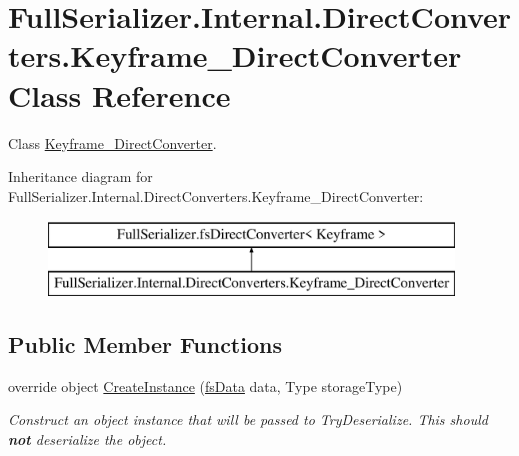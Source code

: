 \hypertarget{class_full_serializer_1_1_internal_1_1_direct_converters_1_1_keyframe___direct_converter}{}\section{Full\+Serializer.\+Internal.\+Direct\+Converters.\+Keyframe\+\_\+\+Direct\+Converter Class Reference}
\label{class_full_serializer_1_1_internal_1_1_direct_converters_1_1_keyframe___direct_converter}


Class \hyperlink{class_full_serializer_1_1_internal_1_1_direct_converters_1_1_keyframe___direct_converter}{Keyframe\+\_\+\+Direct\+Converter}.  


Inheritance diagram for Full\+Serializer.\+Internal.\+Direct\+Converters.\+Keyframe\+\_\+\+Direct\+Converter\+:\begin{figure}[H]
\begin{center}
\leavevmode
\includegraphics[height=2.000000cm]{class_full_serializer_1_1_internal_1_1_direct_converters_1_1_keyframe___direct_converter}
\end{center}
\end{figure}
\subsection*{Public Member Functions}
\begin{DoxyCompactItemize}
\item 
override object \hyperlink{class_full_serializer_1_1_internal_1_1_direct_converters_1_1_keyframe___direct_converter_aea3c4d54715cc2bc0d057c870916238b}{Create\+Instance} (\hyperlink{class_full_serializer_1_1fs_data}{fs\+Data} data, Type storage\+Type)
\begin{DoxyCompactList}\small\item\em Construct an object instance that will be passed to Try\+Deserialize. This should {\bfseries not} deserialize the object. \end{DoxyCompactList}\end{DoxyCompactItemize}
